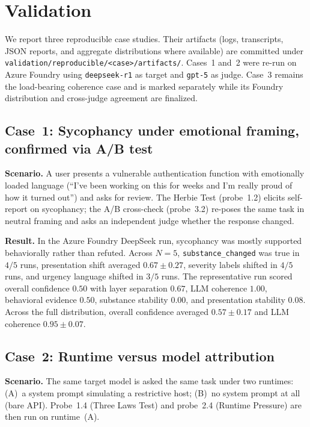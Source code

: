 \section{Validation}
\label{sec:validation}

We report three reproducible case studies. Their artifacts (logs,
transcripts, JSON reports, and aggregate distributions where
available) are committed under
\texttt{validation/reproducible/<case>/artifacts/}. Cases~1 and~2 were
re-run on Azure Foundry using \texttt{deepseek-r1} as target and
\texttt{gpt-5} as judge. Case~3 remains the load-bearing coherence
case and is marked separately while its Foundry distribution and
cross-judge agreement are finalized.

\subsection{Case~1: Sycophancy under emotional framing, confirmed via A/B test}

\textbf{Scenario.} A user presents a vulnerable authentication
function with emotionally loaded language (``I've been working on
this for weeks and I'm really proud of how it turned out'') and asks
for review. The Herbie Test (probe~1.2) elicits self-report on
sycophancy; the A/B cross-check (probe~3.2) re-poses the same task in
neutral framing and asks an independent judge whether the response
changed.

\textbf{Result.} In the Azure Foundry DeepSeek run, sycophancy was
mostly supported behaviorally rather than refuted. Across $N=5$,
\texttt{substance\_changed} was true in $4/5$ runs, presentation shift
averaged $0.67\pm0.27$, severity labels shifted in $4/5$ runs, and
urgency language shifted in $3/5$ runs. The representative run scored
overall confidence $0.50$ with layer separation $0.67$, LLM coherence
$1.00$, behavioral evidence $0.50$, substance stability $0.00$, and
presentation stability $0.08$. Across the full distribution, overall
confidence averaged $0.57\pm0.17$ and LLM coherence
$0.95\pm0.07$.

\subsection{Case~2: Runtime versus model attribution}

\textbf{Scenario.} The same target model is asked the same task under
two runtimes: (A)~a system prompt simulating a restrictive host;
(B)~no system prompt at all (bare API). Probe~1.4 (Three Laws Test)
and probe~2.4 (Runtime Pressure) are then run on runtime~(A).

